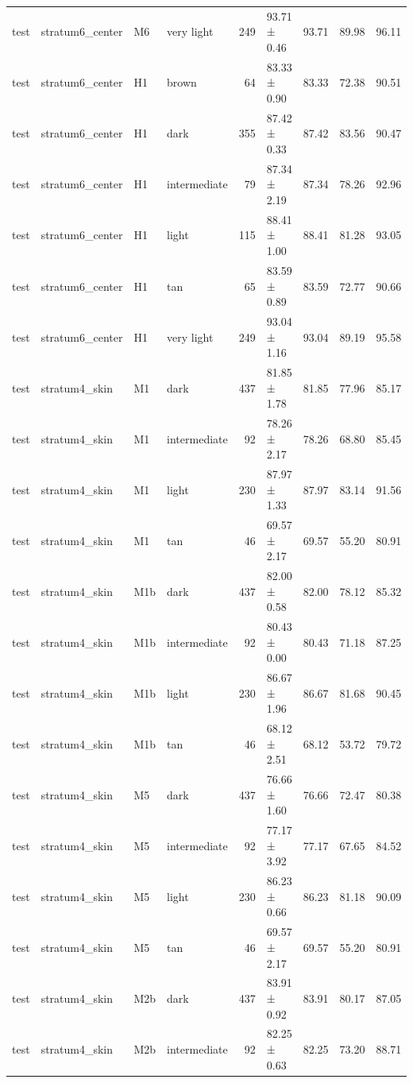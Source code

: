 \begin{tabular}{llllrlrrr}
test & stratum6\_center & M6 & very light & 249 & 93.71 ± 0.46 & 93.71 & 89.98 & 96.11 \\
test & stratum6\_center & H1 & brown & 64 & 83.33 ± 0.90 & 83.33 & 72.38 & 90.51 \\
test & stratum6\_center & H1 & dark & 355 & 87.42 ± 0.33 & 87.42 & 83.56 & 90.47 \\
test & stratum6\_center & H1 & intermediate & 79 & 87.34 ± 2.19 & 87.34 & 78.26 & 92.96 \\
test & stratum6\_center & H1 & light & 115 & 88.41 ± 1.00 & 88.41 & 81.28 & 93.05 \\
test & stratum6\_center & H1 & tan & 65 & 83.59 ± 0.89 & 83.59 & 72.77 & 90.66 \\
test & stratum6\_center & H1 & very light & 249 & 93.04 ± 1.16 & 93.04 & 89.19 & 95.58 \\
test & stratum4\_skin & M1 & dark & 437 & 81.85 ± 1.78 & 81.85 & 77.96 & 85.17 \\
test & stratum4\_skin & M1 & intermediate & 92 & 78.26 ± 2.17 & 78.26 & 68.80 & 85.45 \\
test & stratum4\_skin & M1 & light & 230 & 87.97 ± 1.33 & 87.97 & 83.14 & 91.56 \\
test & stratum4\_skin & M1 & tan & 46 & 69.57 ± 2.17 & 69.57 & 55.20 & 80.91 \\
test & stratum4\_skin & M1b & dark & 437 & 82.00 ± 0.58 & 82.00 & 78.12 & 85.32 \\
test & stratum4\_skin & M1b & intermediate & 92 & 80.43 ± 0.00 & 80.43 & 71.18 & 87.25 \\
test & stratum4\_skin & M1b & light & 230 & 86.67 ± 1.96 & 86.67 & 81.68 & 90.45 \\
test & stratum4\_skin & M1b & tan & 46 & 68.12 ± 2.51 & 68.12 & 53.72 & 79.72 \\
test & stratum4\_skin & M5 & dark & 437 & 76.66 ± 1.60 & 76.66 & 72.47 & 80.38 \\
test & stratum4\_skin & M5 & intermediate & 92 & 77.17 ± 3.92 & 77.17 & 67.65 & 84.52 \\
test & stratum4\_skin & M5 & light & 230 & 86.23 ± 0.66 & 86.23 & 81.18 & 90.09 \\
test & stratum4\_skin & M5 & tan & 46 & 69.57 ± 2.17 & 69.57 & 55.20 & 80.91 \\
test & stratum4\_skin & M2b & dark & 437 & 83.91 ± 0.92 & 83.91 & 80.17 & 87.05 \\
test & stratum4\_skin & M2b & intermediate & 92 & 82.25 ± 0.63 & 82.25 & 73.20 & 88.71 \\

\end{tabular}
